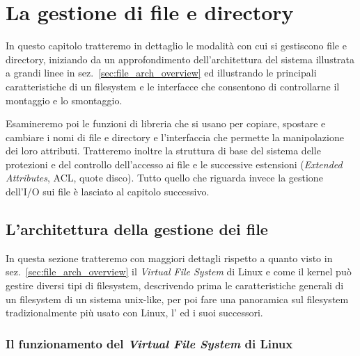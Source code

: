 
\chapter{La gestione di file e directory}
\label{cha:files_and_dirs}

In questo capitolo tratteremo in dettaglio le modalità con cui si gestiscono
file e directory, iniziando da un approfondimento dell'architettura del
sistema illustrata a grandi linee in sez.~\ref{sec:file_arch_overview} ed
illustrando le principali caratteristiche di un filesystem e le interfacce
che consentono di controllarne il montaggio e lo smontaggio. 

Esamineremo poi le funzioni di libreria che si usano per copiare, spostare e
cambiare i nomi di file e directory e l'interfaccia che permette la
manipolazione dei loro attributi. Tratteremo inoltre la struttura di base del
sistema delle protezioni e del controllo dell'accesso ai file e le successive
estensioni (\textit{Extended Attributes}, ACL, quote disco). Tutto quello che
riguarda invece la gestione dell'I/O sui file è lasciato al capitolo
successivo.



\section{L'architettura della gestione dei file}
\label{sec:file_arch_func}

In questa sezione tratteremo con maggiori dettagli rispetto a quanto visto in
sez.~\ref{sec:file_arch_overview} il \textit{Virtual File System} di Linux e
come il kernel può gestire diversi tipi di filesystem, descrivendo prima le
caratteristiche generali di un filesystem di un sistema unix-like, per poi
fare una panoramica sul filesystem tradizionalmente più usato con Linux,
l' ed i suoi successori.


\subsection{Il funzionamento del \textit{Virtual File System} di Linux}
\label{sec:file_vfs_work}

